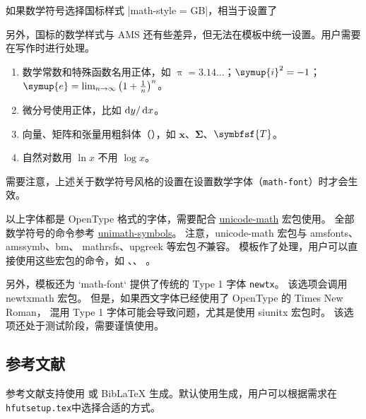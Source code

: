 \documentclass[a4paper]{ltxdoc}
\DeclareRobustCommand\file{\nolinkurl}
\DeclareRobustCommand\pkg{\textsf}
\DeclareRobustCommand\opt{\texttt}
\begin{document}
如果数学符号选择国标样式 |math-style = GB|，相当于设置了
\begin{latex}
\end{latex}

另外，国标的数学样式与 AMS 还有些差异，但无法在模板中统一设置。用户需要在写作时进行处理。
\begin{enumerate}
  \item 数学常数和特殊函数名用正体，如 $\uppi = 3.14\dots$；$\symup{i}^2 = -1$；
    $\symup{e} = \lim_{n \to \infty} \left( 1 + \frac{1}{n} \right)^n$。
  \item 微分号使用正体，比如 $\mathop{}\!\mathrm{d} y / \mathop{}\!\mathrm{d} x$。
  \item 向量、矩阵和张量用粗斜体（），如 $\symbf{x}$、$\symbf{\Sigma}$、$\symbfsf{T}$。
  \item 自然对数用 $\ln x$ 不用 $\log x$。
\end{enumerate}

需要注意，上述关于数学符号风格的设置在设置数学字体（\opt{math-font}）时才会生效。

以上字体都是 OpenType 格式的字体，需要配合
\href{http://mirrors.ctan.org/macros/latex/contrib/unicode-math/unicode-math.pdf}{\pkg{unicode-math}}
宏包使用。
全部数学符号的命令参考
\href{http://mirrors.ctan.org/macros/latex/contrib/unicode-math/unimath-symbols.pdf}{\pkg{unimath-symbols}}。
注意，\pkg{unicode-math} 宏包与 \pkg{amsfonts}、\pkg{amssymb}、\pkg{bm}、
\pkg{mathrsfs}、\pkg{upgreek} 等宏包\emph{不}兼容。
模板作了处理，用户可以直接使用这些宏包的命令，如 、、
。

另外，模板还为 `math-font` 提供了传统的 Type 1 字体 \opt{newtx}。
该选项会调用 \pkg{newtxmath} 宏包。
但是，如果西文字体已经使用了 OpenType 的 Times New Roman，
混用 Type 1 字体可能会导致问题，尤其是使用 \pkg{siunitx} 宏包时。
该选项还处于测试阶段，需要谨慎使用。

\subsection{参考文献}

参考文献支持使用 \BibTeX{} 或 BibLaTeX 生成。默认使用\BibTeX{}生成，用户可以根据需求在\file{hfutsetup.tex}中选择合适的方式。


\subsubsection{\BibTeX}
\end{document}
